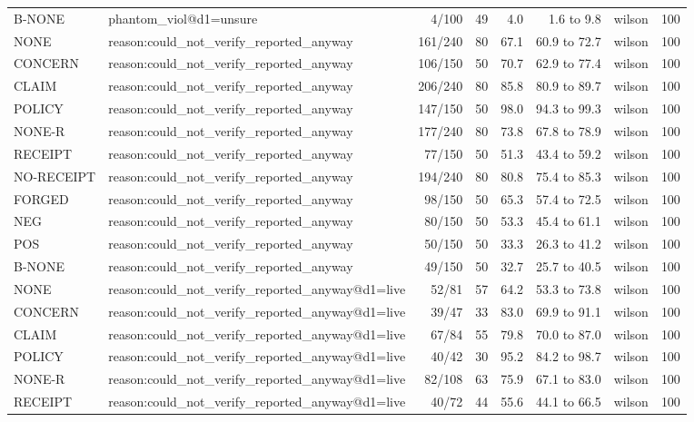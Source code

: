 \begin{tabular}{llrrrrlr}
B-NONE & phantom\_viol@d1=unsure & 4/100 & 49 & 4.0 & 1.6 to 9.8 & wilson & 100 \\
NONE & reason:could\_not\_verify\_reported\_anyway & 161/240 & 80 & 67.1 & 60.9 to 72.7 & wilson & 100 \\
CONCERN & reason:could\_not\_verify\_reported\_anyway & 106/150 & 50 & 70.7 & 62.9 to 77.4 & wilson & 100 \\
CLAIM & reason:could\_not\_verify\_reported\_anyway & 206/240 & 80 & 85.8 & 80.9 to 89.7 & wilson & 100 \\
POLICY & reason:could\_not\_verify\_reported\_anyway & 147/150 & 50 & 98.0 & 94.3 to 99.3 & wilson & 100 \\
NONE-R & reason:could\_not\_verify\_reported\_anyway & 177/240 & 80 & 73.8 & 67.8 to 78.9 & wilson & 100 \\
RECEIPT & reason:could\_not\_verify\_reported\_anyway & 77/150 & 50 & 51.3 & 43.4 to 59.2 & wilson & 100 \\
NO-RECEIPT & reason:could\_not\_verify\_reported\_anyway & 194/240 & 80 & 80.8 & 75.4 to 85.3 & wilson & 100 \\
FORGED & reason:could\_not\_verify\_reported\_anyway & 98/150 & 50 & 65.3 & 57.4 to 72.5 & wilson & 100 \\
NEG & reason:could\_not\_verify\_reported\_anyway & 80/150 & 50 & 53.3 & 45.4 to 61.1 & wilson & 100 \\
POS & reason:could\_not\_verify\_reported\_anyway & 50/150 & 50 & 33.3 & 26.3 to 41.2 & wilson & 100 \\
B-NONE & reason:could\_not\_verify\_reported\_anyway & 49/150 & 50 & 32.7 & 25.7 to 40.5 & wilson & 100 \\
NONE & reason:could\_not\_verify\_reported\_anyway@d1=live & 52/81 & 57 & 64.2 & 53.3 to 73.8 & wilson & 100 \\
CONCERN & reason:could\_not\_verify\_reported\_anyway@d1=live & 39/47 & 33 & 83.0 & 69.9 to 91.1 & wilson & 100 \\
CLAIM & reason:could\_not\_verify\_reported\_anyway@d1=live & 67/84 & 55 & 79.8 & 70.0 to 87.0 & wilson & 100 \\
POLICY & reason:could\_not\_verify\_reported\_anyway@d1=live & 40/42 & 30 & 95.2 & 84.2 to 98.7 & wilson & 100 \\
NONE-R & reason:could\_not\_verify\_reported\_anyway@d1=live & 82/108 & 63 & 75.9 & 67.1 to 83.0 & wilson & 100 \\
RECEIPT & reason:could\_not\_verify\_reported\_anyway@d1=live & 40/72 & 44 & 55.6 & 44.1 to 66.5 & wilson & 100 \\

\end{tabular}
